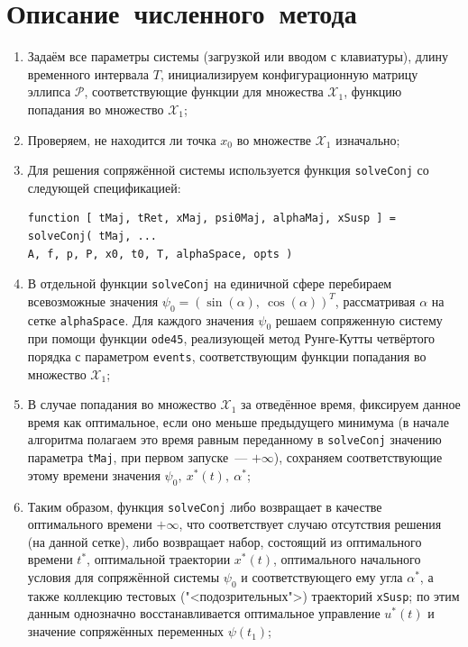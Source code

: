 \documentclass[11pt, oneside, final]{article}
\theoremstyle{break}
\numberwithin{equation}{section}
\theoremstyle{plain}
\theoremstyle{definition}
\begin{document}
    \section{Описание~численного~метода} %
    \label{sec:method}
    \begin{enumerate}
        \item Задаём все параметры системы (загрузкой или вводом с клавиатуры), длину временного интервала \(T\), инициализируем конфигурационную матрицу эллипса \(\mathcal{P}\), соответствующие функции для множества \(\mathcal{X}_1\), функцию попадания во множество \(\mathcal{X}_1\);
        \item Проверяем, не находится ли точка \(x_0\) во множестве \(\mathcal{X}_1\) изначально;
        \item Для решения сопряжённой системы используется функция \texttt{solveConj} со следующей спецификацией: 
        \begin{verbatim}
function [ tMaj, tRet, xMaj, psi0Maj, alphaMaj, xSusp ] = solveConj( tMaj, ...
A, f, p, P, x0, t0, T, alphaSpace, opts )
        \end{verbatim} 
        \item В отдельной функции \texttt{solveConj} на единичной сфере перебираем всевозможные значения \(\psi_0 = \left( \sin(\alpha),\:\cos(\alpha)\right)^T\), рассматривая \(\alpha\) на сетке \texttt{alphaSpace}. Для каждого значения \(\psi_0\) решаем сопряженную систему при помощи функции \texttt{ode45}, реализующей метод Рунге-Кутты четвёртого порядка с параметром \texttt{events}, соответствующим функции попадания во множество \(\mathcal{X}_1\);
        \item В случае попадания во множество \(\mathcal{X}_1\) за отведённое время, фиксируем данное время как оптимальное, если оно меньше предыдущего минимума (в начале алгоритма полагаем это время равным переданному в \texttt{solveConj} значению параметра \texttt{tMaj}, при первом запуске~--- \(+\infty\)), сохраняем соответствующие этому времени значения \(\psi_0,\:x^*(t), \: \alpha^*\);
        \item Таким образом, функция \texttt{solveConj} либо возвращает в качестве оптимального времени \(+\infty\), что соответствует случаю отсутствия решения (на данной сетке), либо возвращает набор, состоящий из оптимального времени \(t^*\), оптимальной траектории \(x^*(t)\), оптимального начального условия для сопряжённой системы \(\psi_0\) и соответствующего ему угла \(\alpha^*\), а также коллекцию тестовых ("<подозрительных">) траекторий \texttt{xSusp}; по этим данным однозначно восстанавливается оптимальное управление \(u^*(t)\) и значение сопряжённых переменных \(\psi(t_1)\);

\end{enumerate}
\end{document}
